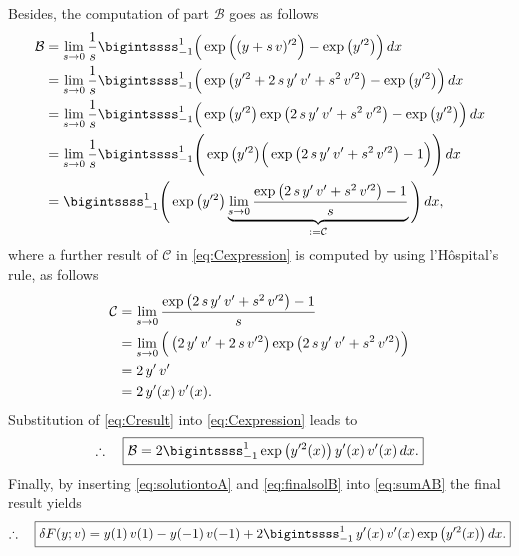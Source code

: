 \documentclass[12pt]{article}
\begin{document}
Besides, the computation of part $\mathcal{B}$ goes as follows
\begin{align}
	\mathcal{B}
	 & =
	\lim_{s\to 0} \frac{1}{s}
	\bigintssss_{-1}^{1}
	\Big(
	\exp{\Big((y+s\,v)^{\prime 2}\Big)}
	- \exp{\big(y^{\prime 2}\big)}
	\Big)\,dx  \notag \\
	 & =
	\lim_{s\to 0} \frac{1}{s}
	\bigintssss_{-1}^{1}
	\Big(
	\exp{
		\big(
		y^{\prime 2}
		+ 2\,s\,y^{\prime}\,v^{\prime}
		+ s^2\,v^{\prime 2}
		\big)}
	- \exp{\big(y^{\prime 2}\big)}
	\Big)\,dx  \notag \\
	 & =
	\lim_{s\to 0} \frac{1}{s}
	\bigintssss_{-1}^{1}
	\Big(
	\exp{\big(y^{\prime 2} \big)}
	\exp{\big(
		2\,s\,y^{\prime}\,v^{\prime}
		+ s^2\,v^{\prime 2}
		\big)}
	- \exp{\big(y^{\prime 2}\big)}
	\Big)\,dx  \notag \\
	 & =
	\lim_{s\to 0} \frac{1}{s}
	\bigintssss_{-1}^{1}
	\Bigg(
	\exp{\big(y^{\prime 2} \big)}
	\Big(
		\exp{\big(
			2\,s\,y^{\prime}\,v^{\prime}
			+ s^2\,v^{\prime 2}
			\big)}
		- 1
		\Big)
	\Bigg)\,dx \notag \\
	 & =
	\bigintssss_{-1}^{1}
	\Bigg(
	\exp{\big(y^{\prime 2} \big)}
	\underbrace{\lim_{s\to 0}
		\frac{
			\exp{\big(
				2\,s\,y^{\prime}\,v^{\prime}
				+ s^2\,v^{\prime 2}
				\big)}
			- 1}{s}}_{:=\mathcal{C}}
	\Bigg)\,dx ,
	\label{eq:Cexpression}
\end{align}
where a further result of $\mathcal{C}$ in 
\eqref{eq:Cexpression} is computed by using l'Hôspital's rule, 
as follows 
\begin{align}
	\mathcal{C}
	 & =
	\lim_{s\to 0}
	\frac{
		\exp{\big(
			2\,s\,y^{\prime}\,v^{\prime}
			+ s^2\,v^{\prime 2}
			\big)}
		- 1}{s}                            \notag \\
	 & =
	\lim_{s\to 0}
	\Big(
	\left(
	2\,y^{\prime}\,v^{\prime}
	+ 2\,s\,v^{\prime 2}
	\right)
	\exp{\big(
		2\,s\,y^{\prime}\,v^{\prime}
		+ s^2\,v^{\prime 2}
		\big)}
	\Big)                              \notag \\
	 & = 2\,y^{\prime}\,v^{\prime} \notag     \\
	 & = 2\,y^{\prime}(x)\,v^{\prime}(x).
	\label{eq:Cresult}
\end{align}
Substitution of 
\eqref{eq:Cresult} into 
\eqref{eq:Cexpression}
leads to 
\begin{align}
	\label{eq:finalsolB}
	\therefore\quad
	\boxed{
	\mathcal{B} = 
	2\bigintssss_{-1}^{1}
	\exp{\left(y^{\prime 2}(x)\right)}
	\,y^{\prime}(x)\,v^{\prime}(x)\,dx.
	}
\end{align}
Finally, by inserting 
\eqref{eq:solutiontoA}
and
\eqref{eq:finalsolB}
into
\eqref{eq:sumAB}
the final result yields
\begin{align}
	\therefore\quad\boxed{
	\delta F(y;v)
	=
	y(1)\,v(1) - y(-1)\,v(-1)
	+
	2\bigintssss_{-1}^{1}
	\,y^{\prime}(x)\,v^{\prime}(x)
	\exp{\left(y^{\prime 2}(x)\right)}
	\,dx.
	}
\end{align}
\end{document}
